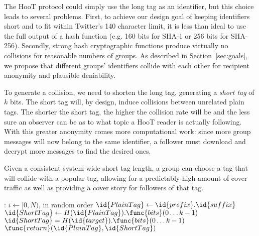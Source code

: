 The HooT protocol could simply use the long tag as an identifier, but
this choice leads to several problems. First, to achieve our design goal
of keeping identifiers short and to fit within Twitter's 140 character
limit, it is less than ideal to use the full output of a hash function
(e.g. 160 bits for SHA-1 or 256 bits for SHA-256). Secondly, strong hash
cryptographic functions produce virtually no collisions for reasonable
numbers of groups. As described in Section~\ref{sec:goals}, we propose
that different groups' identifiers collide with each other for recipient
anonymity and plausible deniability.

To generate a collision, we need to shorten the long tag, generating a
\textit{short tag} of $k$ bits. The short tag will, by design, induce
collisions between unrelated plain tags. The shorter the short tag, the
higher the collision rate will be and the less sure an observer can be
as to what topic a HooT reader is actually following. With this greater
anonymity comes more computational work: since more group messages will
now belong to the same identifier, a follower must download and decrypt
more messages to find the desired ones.

Given a consistent system-wide short tag length, a group can choose a
tag that will collide with a popular tag, allowing for a predictably
high amount of cover traffic as well as providing a cover story for
followers of that tag.
%
\begin{codebox}
:
\zi \For $i \gets [0,N)$, in random order
\zi \Do
\zi $\id{PlainTag} \gets  \id{prefix}.\id{suffix}$
\zi $\id{ShortTag} \gets H(\id{PlainTag}).\func{bits}(0 \ldots k-1)$
\zi \If $\id{ShortTag} = H(\id{target}).\func{bits}(0 \ldots k-1)$
\zi \Then $\func{return} (\id{PlainTag} , \id{ShortTag})$
\zi \End
\End
\end{codebox}

